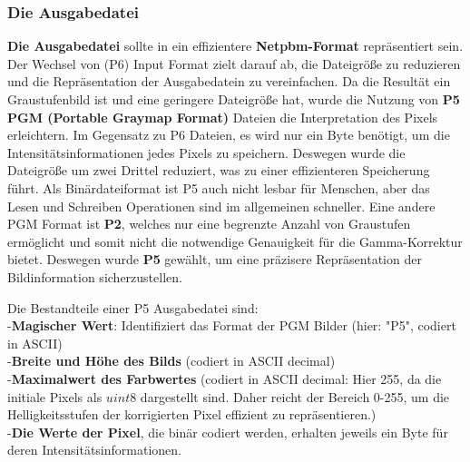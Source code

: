 \documentclass[course=erap]{aspdoc}
\begin{document}
\subsubsection{Die Ausgabedatei}
\textbf{Die Ausgabedatei} sollte in ein effizientere \textbf{Netpbm-Format} repräsentiert sein. Der Wechsel von (P6) Input Format zielt darauf ab, die Dateigröße zu reduzieren und die Repräsentation der Ausgabedatein zu vereinfachen.
Da die Resultät ein Graustufenbild ist und eine geringere Dateigröße hat, wurde die Nutzung von \textbf{P5 PGM (Portable Graymap Format)}\cite{P5Files} Dateien die Interpretation des Pixels erleichtern. Im Gegensatz zu P6 Dateien, es wird nur ein Byte benötigt, um die Intensitätsinformationen jedes Pixels zu speichern. Deswegen wurde die Dateigröße um zwei Drittel reduziert, was zu einer effizienteren Speicherung führt. Als Binärdateiformat ist P5 auch nicht lesbar für Menschen, aber das Lesen und Schreiben Operationen sind im allgemeinen schneller. Eine andere PGM Format ist \textbf{P2}\cite{P2Files}, welches nur eine begrenzte Anzahl von Graustufen ermöglicht und somit nicht die notwendige Genauigkeit für die Gamma-Korrektur bietet. Deswegen wurde \textbf{P5} gewählt, um eine präzisere Repräsentation der Bildinformation sicherzustellen.\par
Die Bestandteile einer P5 Ausgabedatei sind:\\
-\textbf{Magischer Wert}: Identifiziert das Format der PGM Bilder (hier: "P5", codiert in ASCII)\\
-\textbf{Breite und Höhe des Bilds} (codiert in ASCII decimal)\\
-\textbf{Maximalwert des Farbwertes} (codiert in ASCII decimal: Hier 255, da die initiale Pixels als $uint8$ dargestellt sind. Daher reicht der Bereich 0-255, um die Helligkeitsstufen der korrigierten Pixel effizient zu repräsentieren.) \\
-\textbf{Die Werte der Pixel}, die binär codiert werden, erhalten jeweils ein Byte für  deren Intensitätsinformationen.  

\end{document}
